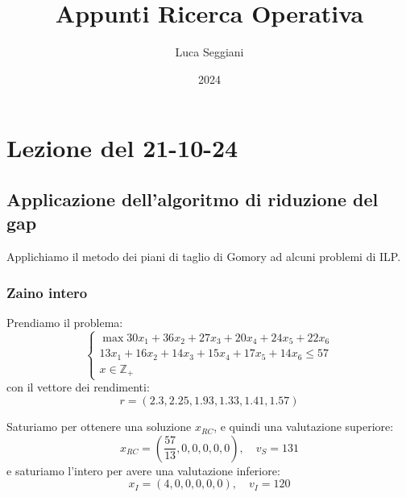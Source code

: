\documentclass[a4paper,11pt]{article}
\title{Appunti Ricerca Operativa}
\author{Luca Seggiani}
\date{2024}
\begin{document}
\section{Lezione del 21-10-24}

\thispagestyle{empty}
\pagestyle{fancy}

\subsection{Applicazione dell'algoritmo di riduzione del gap}
Applichiamo il metodo dei piani di taglio di Gomory ad alcuni problemi di ILP.

\subsubsection{Zaino intero}
Prendiamo il problema:
\[
	\begin{cases}
		\max 30 x_1 + 36 x_2 + 27 x_3 + 20 x_4 + 24 x_5 + 22 x_6 \\ 
		13 x_1 + 16 x_2 + 14 x_3 + 15 x_4 +17 x_5 + 14 x_6 \leq 57 \\ 
		x \in \mathbb{Z}_+
	\end{cases}
\]
con il vettore dei rendimenti:
$$
r = \left( 2.3 , 2.25 , 1.93 , 1.33 , 1.41 , 1.57 \right)
$$

Saturiamo per ottenere una soluzione $x_{RC}$, e quindi una valutazione superiore:
$$
x_{RC} = \left( \frac{57}{13}, 0, 0, 0 ,0 , 0 \right), \quad v_S = 131  
$$
e saturiamo l'intero per avere una valutazione inferiore:
$$
x_{I} = \left( 4, 0, 0, 0, 0, 0 \right), \quad v_I = 120
$$
\end{document}
